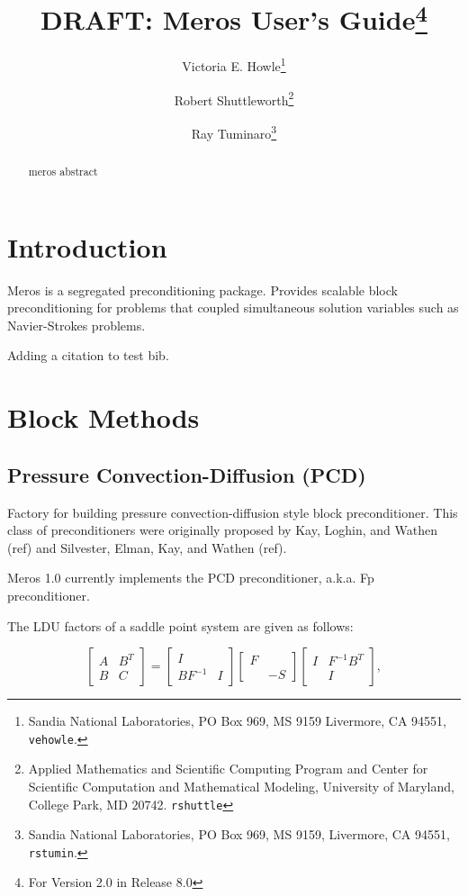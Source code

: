 \documentclass[oneeqnum,onefignum,onetabnum,10pt]{SANDreport}
\title{DRAFT: Meros User's Guide\footnote{For \MerosTM{} Version 2.0 in
\TrilinosTM{} Release 8.0}}
\author{
Victoria E. Howle\thanks{Sandia National Laboratories, PO Box 969, MS 9159
    Livermore, CA 94551, {\tt vehowle}\protect@{\tt sandia.gov}.}
  \and
  Robert Shuttleworth\thanks{Applied Mathematics and Scientific Computing Program and Center for Scientific
Computation and Mathematical Modeling,
University of Maryland, College Park, MD 20742. {\tt rshuttle}\protect@{\tt math.umd.edu}}
  \and
  Ray Tuminaro\thanks{Sandia National Laboratories, PO Box 969, MS 9159,
    Livermore, CA 94551, {\tt rstumin}\protect@{\tt sandia.gov}.}
}
\date{}
\begin{document}
\maketitle
\begin{abstract}
meros abstract
\end{abstract}






\SANDmain

\clearpage
\tableofcontents

%
\section{Introduction}
Meros is a segregated preconditioning package. Provides scalable block
preconditioning for problems that coupled simultaneous solution
variables such as Navier-Strokes problems. 


Adding a citation to test bib\cite{ElmanSilvesterWathen.book}.

\section{Block Methods}
\subsection{Pressure Convection-Diffusion (PCD)}
Factory for building pressure convection-diffusion style block
preconditioner. This class of preconditioners were originally proposed
by Kay, Loghin, and Wathen (ref) and Silvester, Elman, Kay, and Wathen
(ref).

Meros 1.0 currently implements the PCD preconditioner, a.k.a. Fp
preconditioner. 

The LDU factors of a saddle point system are given as follows:

\begin{equation}
  \left[ \begin{array}{cc} A & B^T \\ B & C \end{array} \right]
     = \left[ \begin{array}{cc} I & \\ BF^{-1} & I \end{array} \right]
       \left[ \begin{array}{cc} F & \\  & -S \end{array} \right]
       \left[ \begin{array}{cc} I & F^{-1} B^T  \\  & I \end{array} \right],
\end{equation}
\end{document}
